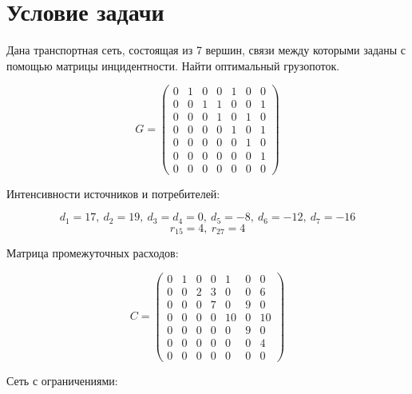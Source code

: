 \documentclass[listings]{labreport}
\begin{document}
\maketitlepage

\section*{Условие задачи}

Дана транспортная сеть, состоящая из 7 вершин, связи между которыми
заданы с помощью матрицы инцидентности. Найти оптимальный грузопоток.

\[
  G = 
\begin{pmatrix}
  0 & 1 & 0 & 0 & 1 & 0 & 0 \\
  0 & 0 & 1 & 1 & 0 & 0 & 1 \\
  0 & 0 & 0 & 1 & 0 & 1 & 0 \\
  0 & 0 & 0 & 0 & 1 & 0 & 1 \\
  0 & 0 & 0 & 0 & 0 & 1 & 0 \\
  0 & 0 & 0 & 0 & 0 & 0 & 1 \\
  0 & 0 & 0 & 0 & 0 & 0 & 0
\end{pmatrix}
\]

Интенсивности источников и потребителей:

$$d_1 = 17,\ d_2 = 19,\ d_3 = d_4 = 0,\ d_5 = -8,\ d_6 = -12,\ d_7 = -16$$ 
$$r_{15} = 4,\ r_{27} = 4$$

Матрица промежуточных расходов:

\[
  C =
\begin{pmatrix}
0 & 1 & 0 & 0 & 1 & 0 & 0 \\
0 & 0 & 2 & 3 & 0 & 0 & 6 \\
0 & 0 & 0 & 7 & 0 & 9 & 0 \\
0 & 0 & 0 & 0 & 10 & 0 & 10 \\
0 & 0 & 0 & 0 & 0 & 9 & 0 \\
0 & 0 & 0 & 0 & 0 & 0 & 4 \\
0 & 0 & 0 & 0 & 0 & 0 & 0
\end{pmatrix}
\]

Сеть с ограничениями:
\end{document}
